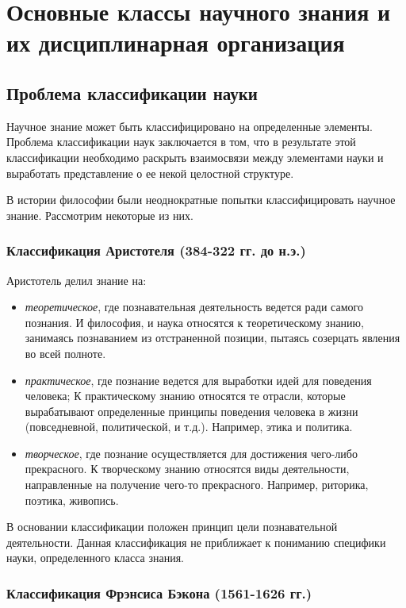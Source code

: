 \section{Основные классы научного знания и их дисциплинарная организация} 

\subsection{Проблема классификации науки}

Научное знание может быть классифицировано на определенные
элементы. Проблема классификации наук заключается в том, что в
результате этой классификации необходимо раскрыть взаимосвязи между элементами
науки и выработать представление о ее некой целостной структуре. 

В истории философии были неоднократные попытки классифицировать научное знание. 
Рассмотрим некоторые из них.

\subsubsection{Классификация Аристотеля (384-322 гг. до н.э.)}

Аристотель делил знание на: 

\begin{itemize}
    \item \textit{теоретическое}, где познавательная деятельность ведется ради самого познания. И философия, и наука относятся к теоретическому знанию, занимаясь познаванием из
    отстраненной позиции, пытаясь созерцать явления во всей полноте. 
    \item \textit{практическое}, где познание ведется для выработки идей для поведения человека; К практическому знанию относятся те отрасли, которые
    вырабатывают определенные принципы поведения человека в жизни (повседневной, политической, и т.д.). Например, этика и политика.
    \item \textit{творческое}, где познание осуществляется для достижения чего-либо
    прекрасного. К творческому знанию относятся виды деятельности, направленные на
получение чего-то прекрасного. Например, риторика, поэтика, живопись.
\end{itemize}

В основании классификации положен принцип цели
познавательной деятельности. Данная классификация не приближает к
пониманию специфики науки, определенного класса знания. 

\subsubsection{Классификация Фрэнсиса Бэкона (1561-1626 гг.)}

